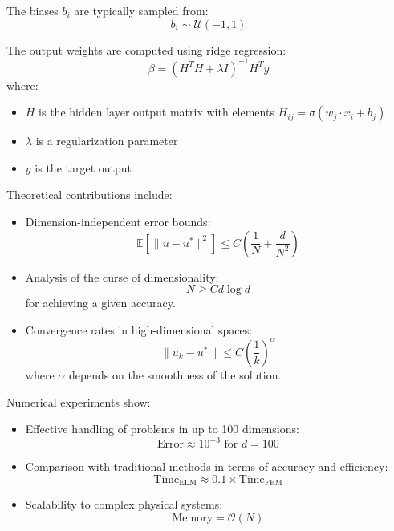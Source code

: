 \documentclass[12pt]{article}
\begin{document}
The biases $b_i$ are typically sampled from:
\begin{equation}
    b_i \sim \mathcal{U}(-1, 1)
\end{equation}

The output weights are computed using ridge regression:
\begin{equation}
    \beta = (H^T H + \lambda I)^{-1} H^T y
\end{equation}
where:
\begin{itemize}
    \item $H$ is the hidden layer output matrix with elements $H_{ij} = \sigma(w_j \cdot x_i + b_j)$
    \item $\lambda$ is a regularization parameter
    \item $y$ is the target output
\end{itemize}

Theoretical contributions include:
\begin{itemize}
    \item Dimension-independent error bounds:
    \begin{equation}
        \mathbb{E}[\|u - u^*\|^2] \leq C \left(\frac{1}{N} + \frac{d}{N^2}\right)
    \end{equation}
    \item Analysis of the curse of dimensionality:
    \begin{equation}
        N \geq C d \log d
    \end{equation}
    for achieving a given accuracy.
    \item Convergence rates in high-dimensional spaces:
    \begin{equation}
        \|u_k - u^*\| \leq C \left(\frac{1}{k}\right)^{\alpha}
    \end{equation}
    where $\alpha$ depends on the smoothness of the solution.
\end{itemize}

Numerical experiments show:
\begin{itemize}
    \item Effective handling of problems in up to 100 dimensions:
    \begin{equation}
        \text{Error} \approx 10^{-3} \text{ for } d = 100
    \end{equation}
    \item Comparison with traditional methods in terms of accuracy and efficiency:
    \begin{equation}
        \text{Time}_{\text{ELM}} \approx 0.1 \times \text{Time}_{\text{FEM}}
    \end{equation}
    \item Scalability to complex physical systems:
    \begin{equation}
        \text{Memory} = \mathcal{O}(N)
    \end{equation}
\end{itemize}
\end{document}
